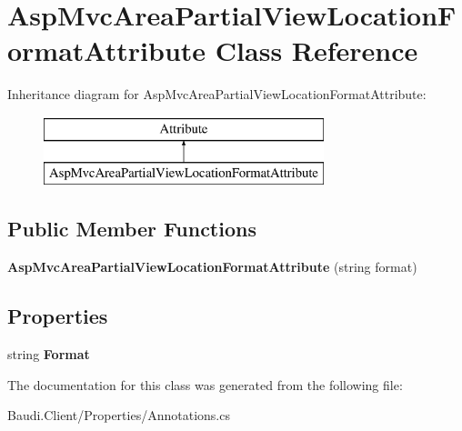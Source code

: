 \hypertarget{class_asp_mvc_area_partial_view_location_format_attribute}{}\section{Asp\+Mvc\+Area\+Partial\+View\+Location\+Format\+Attribute Class Reference}
\label{class_asp_mvc_area_partial_view_location_format_attribute}
Inheritance diagram for Asp\+Mvc\+Area\+Partial\+View\+Location\+Format\+Attribute\+:\begin{figure}[H]
\begin{center}
\leavevmode
\includegraphics[height=2.000000cm]{class_asp_mvc_area_partial_view_location_format_attribute}
\end{center}
\end{figure}
\subsection*{Public Member Functions}
\begin{DoxyCompactItemize}
\item 
\hypertarget{class_asp_mvc_area_partial_view_location_format_attribute_a2cceb11c102f6ddf218094062d74b161}{}{\bfseries Asp\+Mvc\+Area\+Partial\+View\+Location\+Format\+Attribute} (string format)\label{class_asp_mvc_area_partial_view_location_format_attribute_a2cceb11c102f6ddf218094062d74b161}

\end{DoxyCompactItemize}
\subsection*{Properties}
\begin{DoxyCompactItemize}
\item 
\hypertarget{class_asp_mvc_area_partial_view_location_format_attribute_a9de8c471614445bbbcbf2051209ec446}{}string {\bfseries Format}\label{class_asp_mvc_area_partial_view_location_format_attribute_a9de8c471614445bbbcbf2051209ec446}

\end{DoxyCompactItemize}


The documentation for this class was generated from the following file\+:\begin{DoxyCompactItemize}
\item 
Baudi.\+Client/\+Properties/Annotations.\+cs\end{DoxyCompactItemize}
